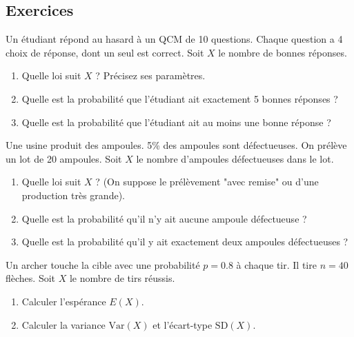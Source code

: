 \subsection{Exercices}


\begin{exercicebox}
Un étudiant répond au hasard à un QCM de 10 questions. Chaque question a 4 choix de réponse, dont un seul est correct. Soit $X$ le nombre de bonnes réponses.
\begin{enumerate}
    \item Quelle loi suit $X$ ? Précisez ses paramètres.
    \item Quelle est la probabilité que l'étudiant ait exactement 5 bonnes réponses ?
    \item Quelle est la probabilité que l'étudiant ait au moins une bonne réponse ?
\end{enumerate}
\end{exercicebox}

\begin{exercicebox}
Une usine produit des ampoules. 5\% des ampoules sont défectueuses. On prélève un lot de 20 ampoules. Soit $X$ le nombre d'ampoules défectueuses dans le lot.
\begin{enumerate}
    \item Quelle loi suit $X$ ? (On suppose le prélèvement "avec remise" ou d'une production très grande).
    \item Quelle est la probabilité qu'il n'y ait aucune ampoule défectueuse ?
    \item Quelle est la probabilité qu'il y ait exactement deux ampoules défectueuses ?
\end{enumerate}
\end{exercicebox}

\begin{exercicebox}
Un archer touche la cible avec une probabilité $p=0.8$ à chaque tir. Il tire $n=40$ flèches. Soit $X$ le nombre de tirs réussis.
\begin{enumerate}
    \item Calculer l'espérance $E(X)$.
    \item Calculer la variance $\text{Var}(X)$ et l'écart-type $\text{SD}(X)$.
\end{enumerate}
\end{exercicebox}

